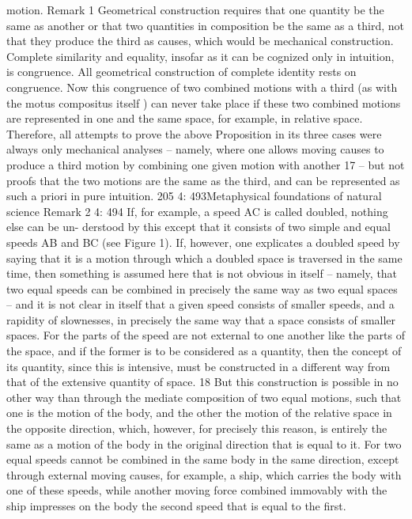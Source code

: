motion.
Remark 1
Geometrical construction requires that one quantity be the same as another
or that two quantities in composition be the same as a third, not that they
produce the third as causes, which would be mechanical construction.
Complete similarity and equality, insofar as it can be cognized only in
intuition, is congruence. All geometrical construction of complete identity
rests on congruence. Now this congruence of two combined motions
with a third (as with the motus compositus itself ) can never take place if
these two combined motions are represented in one and the same space,
for example, in relative space. Therefore, all attempts to prove the above
Proposition in its three cases were always only mechanical analyses –
namely, where one allows moving causes to produce a third motion by
combining one given motion with another 17 – but not proofs that the
two motions are the same as the third, and can be represented as such a
priori in pure intuition.
205
4: 493Metaphysical foundations of natural science
Remark 2
4: 494
If, for example, a speed AC is called doubled, nothing else can be un-
derstood by this except that it consists of two simple and equal speeds
AB and BC (see Figure 1). If, however, one explicates a doubled speed
by saying that it is a motion through which a doubled space is traversed
in the same time, then something is assumed here that is not obvious in
itself – namely, that two equal speeds can be combined in precisely the
same way as two equal spaces – and it is not clear in itself that a given
speed consists of smaller speeds, and a rapidity of slownesses, in precisely
the same way that a space consists of smaller spaces. For the parts of the
speed are not external to one another like the parts of the space, and
if the former is to be considered as a quantity, then the concept of its
quantity, since this is intensive, must be constructed in a different way
from that of the extensive quantity of space. 18 But this construction is
possible in no other way than through the mediate composition of two
equal motions, such that one is the motion of the body, and the other the
motion of the relative space in the opposite direction, which, however,
for precisely this reason, is entirely the same as a motion of the body in
the original direction that is equal to it. For two equal speeds cannot be
combined in the same body in the same direction, except through external
moving causes, for example, a ship, which carries the body with one of
these speeds, while another moving force combined immovably with the
ship impresses on the body the second speed that is equal to the ﬁrst.
